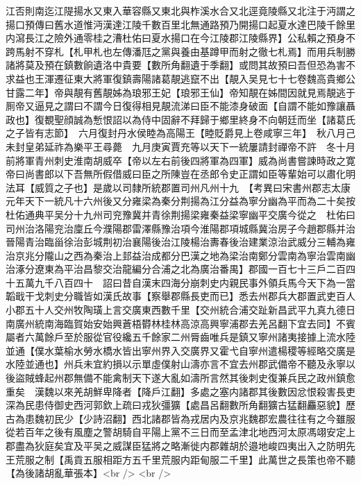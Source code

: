江否則南迄江隄揚水又東入華容縣又東北與柞溪水合又北逕竟陵縣又北注于沔謂之揚口預傳曰舊水道惟沔漢達江陵千數百里北無通路預乃開揚口起夏水達巴陵千餘里内瀉長江之險外通零桂之漕杜佑曰夏水揚口在今江陵郡江陵縣界】公私賴之預身不跨馬射不穿札【札甲札也左傳潘尫之黨與養由基蹲甲而射之徹七札焉】而用兵制勝諸將莫及預在鎮數餉遺洛中貴要【數所角翻遺于季翻】或問其故預曰吾但恐為害不求益也王渾遷征東大將軍復鎮壽陽諸葛靚逃竄不出【靚入吴見七十七卷魏高貴鄉公甘露二年】帝與靚有舊靚姊為琅邪王妃【琅邪王仙】帝知靚在姊間因就見焉靚逃于厠帝又逼見之謂曰不謂今日復得相見靚流涕曰臣不能漆身破面【自謂不能如豫讓聶政也】復覩聖顔誠為慙恨詔以為侍中固辭不拜歸于鄉里終身不向朝廷而坐【諸葛氏之子皆有志節】　六月復封丹水侯睦為高陽王【睦貶爵見上卷咸寧三年】　秋八月己未封皇弟延祚為樂平王尋薨　九月庚寅賈充等以天下一統屢請封禪帝不許　冬十月前將軍青州刺史淮南胡威卒【帝以左右前後四將軍為四軍】威為尚書嘗諫時政之寛帝曰尚書郎以下吾無所假借威曰臣之所陳豈在丞郎令史正謂如臣等輩始可以肅化明法耳【威質之子也】是歲以司隸所統郡置司州凡州十九　【考異曰宋書州郡志太康元年天下一統凡十六州後又分雍梁為秦分荆揚為江分益為寧分幽為平而為二十矣按杜佑通典平吴分十九州司兖豫冀并青徐荆揚梁雍秦益梁寧幽平交廣今從之　杜佑曰司州治洛陽兖治廩丘今濮陽郡雷澤縣豫治項今淮陽郡項城縣冀治房子今趙郡縣并治晉陽青治臨甾徐治彭城荆初治襄陽後治江陵楊治夀春後治建業涼治武威分三輔為雍治京兆分隴山之西為秦治上邽益治成都分巴漢之地為梁治南鄭分雲南為寧治雲南幽治涿分遼東為平治昌黎交治龍編分合浦之北為廣治番禺】郡國一百七十三戶二百四十五萬九千八百四十　詔曰昔自漢末四海分崩刺史内親民事外領兵馬今天下為一當韜戢干戈刺史分職皆如漢氏故事【察舉郡縣長吏而已】悉去州郡兵大郡置武吏百人小郡五十人交州牧陶璜上言交廣東西數千里【交州統合浦交趾新昌武平九真九德日南廣州統南海臨賀始安始興蒼梧欎林桂林高涼高興寧浦郡去羌呂翻下宜去同】不賓屬者六萬餘戶至於服從官役纔五千餘家二州脣齒唯兵是鎮又寧州諸夷接據上流水陸並通【僕水葉榆水勞水橋水皆出寧州界入交廣界又霍弋自寧州遣楊稷等經略交廣是水陸並通也】州兵未宜約損以示單虛僕射山濤亦言不宜去州郡武備帝不聽及永寧以後盜賊蜂起州郡無備不能禽制天下遂大亂如濤所言然其後刺史復兼兵民之政州鎮愈重矣　漢魏以來羌胡鮮卑降者【降戶江翻】多處之塞内諸郡其後數因忿恨殺害長吏深為民患侍御史西河郭欽上疏曰戎狄彊獷【處昌呂翻數所角翻獷古猛翻麤惡貌】歷古為患魏初民少【少詩沼翻】西北諸郡皆為戎居内及京兆魏郡宏農往往有之今雖服從若百年之後有風塵之警胡騎自平陽上黨不三日而至孟津北地西河太原馮翊安定上郡盡為狄庭矣宜及平吴之威謀臣猛將之略漸徙内郡雜胡於邉地峻四夷出入之防明先王荒服之制【禹貢五服相距方五千里荒服内距甸服二千里】此萬世之長策也帝不聽【為後諸胡亂華張本】<br />
<br />
